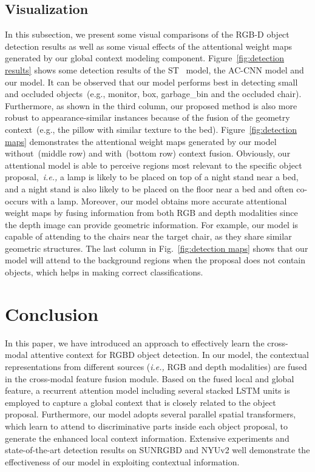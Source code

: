 \documentclass[journal]{IEEEtran}
\begin{document}
\subsection{Visualization} 
\label{sec:visualization}
In this subsection, we present some visual comparisons of the RGB-D object detection results as well as some visual effects of the attentional weight maps generated by our global context modeling component. Figure~\ref{fig:detection results} shows some detection results of the ST~\cite{gupta2016cross} model, the AC-CNN \cite{li2016attentive} model and our model. It can be observed that our model performs best in detecting small and occluded objects~(e.g., monitor, box, garbage\_bin and the occluded chair). Furthermore, as shown in the third column, our proposed method is also more robust to appearance-similar instances because of the fusion of the geometry context~(e.g., the pillow with similar texture to the bed). Figure~\ref{fig:detection maps} demonstrates the attentional weight maps generated by our model without~(middle row) and with~(bottom row) context fusion. Obviously, our attentional model is able to perceive regions most relevant to the specific object proposal,~\textit{i.e.,} a lamp is likely to be placed on top of a night stand near a bed, and a night stand is also likely to be placed on the floor near a bed and often co-occurs with a lamp. Moreover, our model obtains more accurate attentional weight maps by fusing information from both RGB and depth modalities since the depth image can provide geometric information. For example, our model is capable of attending to the chairs near the target chair, as they share similar geometric structures. The last column in Fig.~\ref{fig:detection maps} shows that our model will attend to the background regions when the proposal does not contain objects, which helps in making correct classifications.


\section{Conclusion}
In this paper, we have introduced an approach to effectively learn the cross-modal attentive context for RGBD object detection. In our model, the contextual representations from different sources (\textit{i.e.,} RGB and depth modalities) are fused in the cross-modal feature fusion module. Based on the fused local and global feature, a recurrent attention model including several stacked LSTM units is employed to capture a global context that is closely related to the object proposal. Furthermore, our model adopts several parallel spatial transformers, which learn to attend to discriminative parts inside each object proposal, to generate the enhanced local context information. Extensive experiments and state-of-the-art detection results on SUNRGBD and NYUv2 well demonstrate the effectiveness of our model in exploiting contextual information.
\end{document}
